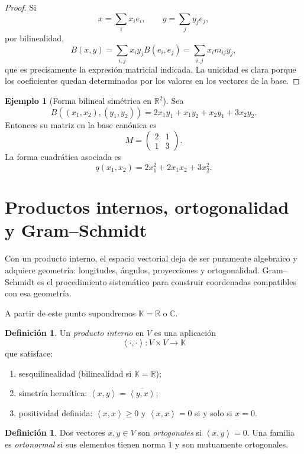 \documentclass[10pt,a4paper,oneside]{article}
\theoremstyle{plain}
\theoremstyle{definition}
\newtheorem{definition}[theorem]{Definición}
\newtheorem{example}[theorem]{Ejemplo}
\theoremstyle{remark}
\newcommand{\K}{\mathbb{K}}
\newcommand{\R}{\mathbb{R}}
\newcommand{\C}{\mathbb{C}}
\newcommand{\angles}[1]{\left\langle #1 \right\rangle}
\begin{document}
\begin{proof}
Si
\[
x=\sum_i x_i e_i,
\qquad
y=\sum_j y_j e_j,
\]
por bilinealidad,
\[
B(x,y)=\sum_{i,j} x_i y_j B(e_i,e_j)=\sum_{i,j} x_i m_{ij} y_j,
\]
que es precisamente la expresión matricial indicada. La unicidad es clara porque los coeficientes quedan determinados por los valores en los vectores de la base. \end{proof}

\begin{example}[Forma bilineal simétrica en \(\R^2\)]
Sea
\[
B((x_1,x_2),(y_1,y_2))=2x_1y_1+x_1y_2+x_2y_1+3x_2y_2.
\]
Entonces su matriz en la base canónica es
\[
M=
\begin{pmatrix}
2 & 1\\
1 & 3
\end{pmatrix}.
\]
La forma cuadrática asociada es
\[
q(x_1,x_2)=2x_1^2+2x_1x_2+3x_2^2.
\]
\end{example}

\section{Productos internos, ortogonalidad y Gram--Schmidt}
\begin{summaryBox}
Con un producto interno, el espacio vectorial deja de ser puramente algebraico y adquiere geometría: longitudes, ángulos, proyecciones y ortogonalidad. Gram--Schmidt es el procedimiento sistemático para construir coordenadas compatibles con esa geometría.
\end{summaryBox}
A partir de este punto supondremos \(\K=\R\) o \(\C\).

\begin{definition}
Un \emph{producto interno} en \(V\) es una aplicación
\[
\angles{\cdot,\cdot}:V\times V\to\K
\]
que satisface:
\begin{enumerate}[label=\textup{(\roman*)}]
\item sesquilinealidad (bilinealidad si \(\K=\R\));
\item simetría hermítica: \(\angles{x,y}=\overline{\angles{y,x}}\);
\item positividad definida: \(\angles{x,x}\ge 0\) y \(\angles{x,x}=0\) si y solo si \(x=0\).
\end{enumerate}
\end{definition}

\begin{definition}
Dos vectores \(x,y\in V\) son \emph{ortogonales} si \(\angles{x,y}=0\). Una familia es \emph{ortonormal} si sus elementos tienen norma \(1\) y son mutuamente ortogonales.
\end{definition}
\end{document}
